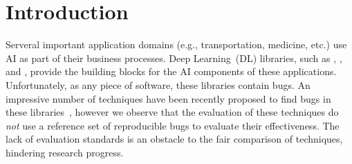 \documentclass[sigconf,screen]{acmart}
\begin{document}



\maketitle

\section{Introduction}

\sloppy Serveral important application domains (e.g., transportation,
medicine, etc.) use AI as part of their business processes. Deep
Learning~(DL) libraries, such as \jax, \torch{}, and \tf{}, provide
the building blocks for the AI components of these applications.
Unfortunately, as any piece of software, these libraries contain
bugs. An impressive number of techniques have been recently proposed
to find bugs in these
libraries~\cite{wei2022free,xie2022docter,deng2022fuzzing,pham2019cradle,guo2020audee,wang2020deep,gu2022muffin,deng2023large,liu2023nnsmith,liu2023neuri,shi2023acetest,deng2023largeedge},
however we observe that the evaluation of these techniques do
\emph{not} use a reference set of reproducible bugs to evaluate their
effectiveness. The lack of evaluation standards is an obstacle to the
fair comparison of techniques, hindering research progress.
\end{document}
